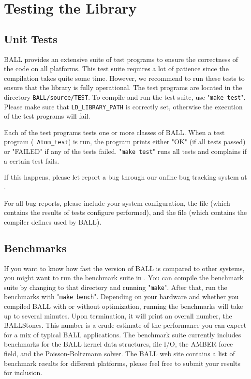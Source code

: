 \section{Testing the Library}

\subsection{Unit Tests}

BALL provides an extensive suite of test programs to ensure the correctness of
the code on all platforms. This test suite requires a lot of patience since
the compilation takes quite some time. However, we recommend to run these
tests to ensure that the library is fully operational. The test programs are
located in the directory {\tt BALL/source/TEST}. To compile and run the test
suite, use "{\tt make test}". Please make sure that {\tt LD\_LIBRARY\_PATH} is
correctly set, otherwise the execution of the test programs will fail.

Each of the test programs tests one or more classes of BALL. When a test
program (\eg~{\tt Atom\_test}) is run, the program prints either "OK" (if all
tests passed) or "FAILED" if any of the tests failed. "{\tt make test}" runs
all tests and complains if a certain test fails.  


If this happens, please let report a bug through our online bug tracking
system at .

\noindent
For all bug reports, please include your system configuration, the file
 (which contains the results of tests configure performed),
and the file  (which contains the compiler
defines used by BALL).

\subsection{Benchmarks}

If you want to know how fast the version of BALL is compared to other systems,
you might want to run the benchmark suite in .
You can compile the benchmark suite by changing to that directory and running
"{\tt make}". After that, run the benchmarks with "{\tt make bench}".
Depending on your hardware and whether you compiled BALL with or without
optimization, running the benchmarks will take up to several minutes. Upon
termination, it will print an overall number, the BALLStones. This number is a
crude estimate of the performance you can expect for a mix of typical BALL
applications. The benchmark suite currently includes benchmarks for the BALL
kernel data structures, file I/O, the AMBER force field, and the
Poisson-Boltzmann solver. The BALL web site contains a list of benchmark
results for different platforms, please feel free to submit your results for
inclusion.
